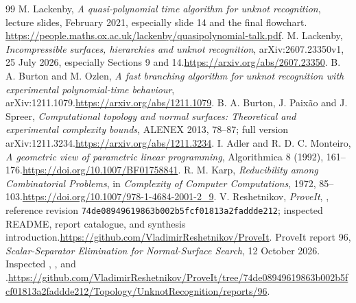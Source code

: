 \documentclass[11pt,a4paper]{article}
\theoremstyle{definition}
\theoremstyle{remark}
\newcommand{\pin}{\texttt{74de08949619863b002b5fcf01813a2faddde212}}
\begin{document}
\clearpage
\begingroup\footnotesize\setlength{\parskip}{0pt}\tableofcontents\endgroup
\clearpage






\appendix

\begin{thebibliography}{99}
 M. Lackenby, \emph{A quasi-polynomial time algorithm for unknot recognition}, lecture slides, February 2021, especially slide 14 and the final flowchart.\newline
\url{https://people.maths.ox.ac.uk/lackenby/quasipolynomial-talk.pdf}.
 M. Lackenby, \emph{Incompressible surfaces, hierarchies and unknot recognition}, arXiv:2607.23350v1, 25 July 2026, especially Sections 9 and 14.\newline \url{https://arxiv.org/abs/2607.23350}.
 B. A. Burton and M. Ozlen, \emph{A fast branching algorithm for unknot recognition with experimental polynomial-time behaviour}, arXiv:1211.1079.\newline \url{https://arxiv.org/abs/1211.1079}.
 B. A. Burton, J. Paix\~ao and J. Spreer, \emph{Computational topology and normal surfaces: Theoretical and experimental complexity bounds}, ALENEX 2013, 78--87; full version arXiv:1211.3234.\newline \url{https://arxiv.org/abs/1211.3234}.
 I. Adler and R. D. C. Monteiro, \emph{A geometric view of parametric linear programming}, Algorithmica 8 (1992), 161--176.\newline \url{https://doi.org/10.1007/BF01758841}.
 R. M. Karp, \emph{Reducibility among Combinatorial Problems}, in \emph{Complexity of Computer Computations}, 1972, 85--103.\newline \url{https://doi.org/10.1007/978-1-4684-2001-2_9}.
 V. Reshetnikov, \emph{ProveIt}, , reference revision \pin; inspected README, report catalogue, and synthesis introduction.\newline \url{https://github.com/VladimirReshetnikov/ProveIt}.
 ProveIt report 96, \emph{Scalar-Separator Elimination for Normal-Surface Search}, 12 October 2026. Inspected , , and .\newline \url{https://github.com/VladimirReshetnikov/ProveIt/tree/74de08949619863b002b5fcf01813a2faddde212/Topology/UnknotRecognition/reports/96}.
\end{thebibliography}
\end{document}
